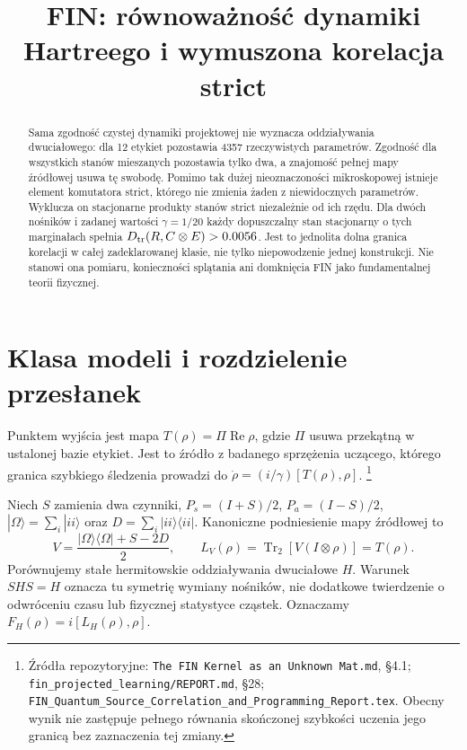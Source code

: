 \documentclass[11pt,a4paper]{article}
\title{FIN: równoważność dynamiki Hartreego i wymuszona korelacja strict}
\author{}
\date{}
\newcommand{\Tr}{\operatorname{Tr}}
\newcommand{\Rea}{\operatorname{Re}}
\newcommand{\Dtr}{D_{\rm tr}}
\begin{document}
\maketitle

\begin{abstract}
Sama zgodność czystej dynamiki projektowej nie wyznacza oddziaływania
dwuciałowego: dla 12 etykiet pozostawia 4357 rzeczywistych parametrów.
Zgodność dla wszystkich stanów mieszanych pozostawia tylko dwa, a
znajomość pełnej mapy źródłowej usuwa tę swobodę. Pomimo tak dużej
nieoznaczoności mikroskopowej istnieje element komutatora strict,
którego nie zmienia żaden z niewidocznych parametrów. Wyklucza on
stacjonarne produkty stanów strict niezależnie od ich rzędu.
Dla dwóch nośników i zadanej wartości $\gamma=1/20$ każdy dopuszczalny
stan stacjonarny o tych marginałach spełnia
$\Dtr(R,C\otimes E)>0.0056$. Jest to jednolita dolna granica korelacji
w całej zadeklarowanej klasie, nie tylko niepowodzenie jednej konstrukcji.
Nie stanowi ona pomiaru, konieczności splątania ani domknięcia FIN
jako fundamentalnej teorii fizycznej.
\end{abstract}

\section{Klasa modeli i rozdzielenie przesłanek}

Punktem wyjścia jest mapa $T(\rho)=\Pi\Rea\rho$, gdzie $\Pi$ usuwa
przekątną w ustalonej bazie etykiet. Jest to źródło z badanego
sprzężenia uczącego, którego granica szybkiego śledzenia prowadzi
do $\dot\rho=(i/\gamma)[T(\rho),\rho]$.
\footnote{Źródła repozytoryjne: \texttt{The FIN Kernel as an Unknown Mat.md},
§4.1; \texttt{fin\_projected\_learning/REPORT.md}, §28;
\texttt{FIN\_Quantum\_Source\_Correlation\_and\_Programming\_Report.tex}.
Obecny wynik nie zastępuje pełnego równania skończonej szybkości uczenia
jego granicą bez zaznaczenia tej zmiany.}

Niech $S$ zamienia dwa czynniki, $P_s=(I+S)/2$, $P_a=(I-S)/2$,
$|\Omega\rangle=\sum_i|ii\rangle$ oraz
$D=\sum_i|ii\rangle\langle ii|$. Kanoniczne podniesienie mapy źródłowej to
\begin{equation}\label{eq:V}
 V=\frac{|\Omega\rangle\langle\Omega|+S-2D}{2},\qquad
 L_V(\rho)=\Tr_2[V(I\otimes\rho)]=T(\rho).
\end{equation}
Porównujemy stałe hermitowskie oddziaływania dwuciałowe $H$.
Warunek $SHS=H$ oznacza tu symetrię wymiany nośników, nie dodatkowe
twierdzenie o odwróceniu czasu lub fizycznej statystyce cząstek.
Oznaczamy
$F_H(\rho)=i[L_H(\rho),\rho]$.
\end{document}
